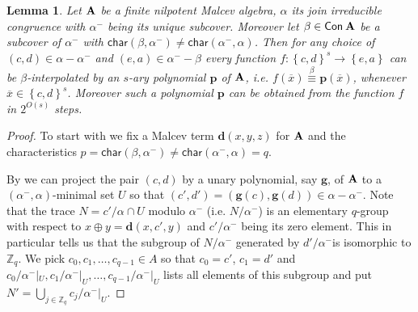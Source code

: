 \documentclass[11pt,a4paper]{amsart}
\newtheorem{lm}{Lemma}[section]
\newcommand{\m}[1]{{\uppercase {\bf{#1}}}}
\newcommand{\set}[1]{{\left\{ {#1} \right\} }}
\newcommand{\con}[1]{{\sf Con\:\m{#1}}}
\newcommand{\po}[1]{{\mathbf {#1}}}
\renewcommand{\o}[1]{\overline {#1}}
\newcommand{\map}{\longrightarrow}
\newcommand{\congruent}[1]{\stackrel{#1}{\equiv}}
\newcommand{\charr}{\mathsf{char}}
\newcommand{\setm}{-}
\newcommand{\z}{\mathbb{Z}}
\begin{document}
\begin{lm}
\label{lm:beta-int}
Let $\m A$ be a finite nilpotent Malcev algebra,
$\alpha$ its join irreducible congruence with $\alpha^-$ being its unique subcover.
Moreover let $\beta\in \con A$ be a subcover of $\alpha^-$ with $\charr(\beta,\alpha^-)\neq\charr(\alpha^-,\alpha)$.
Then for any choice of $(c,d)\in\alpha\setm\alpha^-$ and $(e,a)\in\alpha^-\setm\beta$
every function $f: \set{c,d}^s \map \set{e,a}$ can be $\beta$-interpolated
by an $s$-ary polynomial $\po p$ of $\m A$,
i.e. $f(\o x)\congruent{\beta}\po p(\o x)$, whenever $\o x \in\set{c,d}^s$.
Moreover such a polynomial $\po p$ can be obtained from the function $f$ in $2^{O(s)}$ steps.
\end{lm}

\begin{proof}
To start with we fix a Malcev term $\po d(x,y,z)$ for $\m A$ and the characteristics
$p=\charr{(\beta,\alpha^-)}\neq\charr{(\alpha^-,\alpha)}=q$.

By \cite[Theorem 2.8.(4)]{hm} we can project the pair $(c,d)$ by a unary polynomial, say $\po g$,
of $\m A$ to a $(\alpha^-,\alpha)$-minimal set $U$
so that $(c',d')=(\po g(c),\po g(d))\in \alpha\setm\alpha^-$.
Note that the trace $N=c'/\alpha \cap U$ modulo $\alpha^-$ (i.e. $N/\alpha^-$)
is an elementary $q$-group with respect to $x\oplus y = \po d(x,c',y)$
and $c'/\alpha^-$ being its zero element.
This in particular tells us that the subgroup of $N/\alpha^-$ generated by $d'/\alpha^-$is isomorphic to $\z_q$.
We pick $c_0,c_1,\ldots,c_{q-1}\in A$ so that $c_0=c'$, $c_1=d'$ and
$c_0/\alpha^-|_U,c_1/\alpha^-|_U,\ldots,c_{q-1}/\alpha^-|_U$
lists all elements of this subgroup and put
$N'=\bigcup_{j\in\z_q} c_j/\alpha^-|_U$.


\end{proof}
\end{document}

